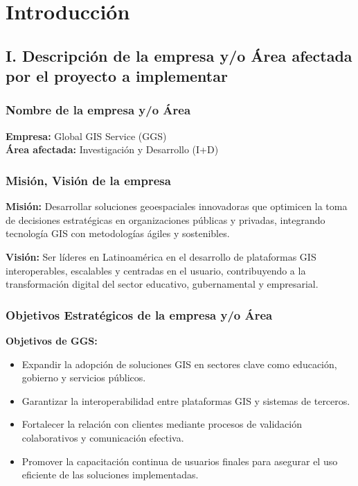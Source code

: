 \section{Introducción}

\subsection{I. Descripción de la empresa y/o Área afectada por el proyecto a implementar}

\subsubsection{Nombre de la empresa y/o Área}
\textbf{Empresa:} Global GIS Service (GGS) \\
\textbf{Área afectada:} Investigación y Desarrollo (I+D)

\subsubsection{Misión, Visión de la empresa}
\textbf{Misión:} Desarrollar soluciones geoespaciales innovadoras que optimicen la toma de decisiones estratégicas en organizaciones públicas y privadas, integrando tecnología GIS con metodologías ágiles y sostenibles.

\textbf{Visión:} Ser líderes en Latinoamérica en el desarrollo de plataformas GIS interoperables, escalables y centradas en el usuario, contribuyendo a la transformación digital del sector educativo, gubernamental y empresarial.

\subsubsection{Objetivos Estratégicos de la empresa y/o Área}
\textbf{Objetivos de GGS:}
\begin{itemize}
  \item Expandir la adopción de soluciones GIS en sectores clave como educación, gobierno y servicios públicos.
  \item Garantizar la interoperabilidad entre plataformas GIS y sistemas de terceros.
  \item Fortalecer la relación con clientes mediante procesos de validación colaborativos y comunicación efectiva.
  \item Promover la capacitación continua de usuarios finales para asegurar el uso eficiente de las soluciones implementadas.
\end{itemize}

